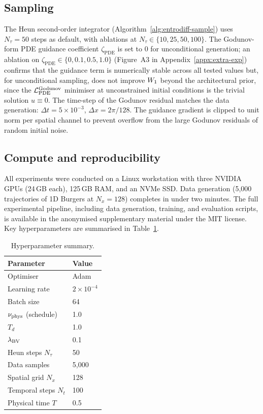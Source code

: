 \subsection{Sampling}
\label{appx:impl:sample}

The Heun second-order integrator (Algorithm~\ref{alg:entrodiff-sample}) uses
$N_{\tau}=50$ steps as default, with ablations at $N_{\tau}\in\{10,25,50,100\}$.
The Godunov-form {PDE} guidance coefficient $\zeta_{\mathrm{PDE}}$ is set to
$0$ for unconditional generation; an ablation on $\zeta_{\mathrm{PDE}}\in\{0,0.1,0.5,1.0\}$
(Figure~A3 in Appendix~\ref{appx:extra-exp}) confirms that the guidance term is numerically
stable across all tested values but, for unconditional sampling, does not
improve $W_{1}$ beyond the architectural prior, since the $\mathcal{L}_{\mathrm{PDE}}^{\mathrm{Godunov}}$
minimiser at unconstrained initial conditions is the trivial solution $u\equiv0$.
The time-step of the Godunov residual matches the data generation:
$\Delta t=5\times10^{-3}$, $\Delta x=2\pi/128$.
The guidance gradient is clipped to unit norm per spatial channel to prevent
overflow from the large Godunov residuals of random initial noise.

\subsection{Compute and reproducibility}
\label{appx:impl:compute}

All experiments were conducted on a Linux workstation with three NVIDIA GPUs
(24\,GB each), 125\,GB RAM, and an NVMe SSD. Data generation (5,000 trajectories
of 1D Burgers at $N_{x}=128$) completes in under two minutes. The full
experimental pipeline, including data generation, training, and evaluation
scripts, is available in the anonymised supplementary material under the
MIT license. Key hyperparameters are summarised in Table~\ref{tab:hyperparams}.

\begin{table}[h]
    \caption{Hyperparameter summary.}
    \label{tab:hyperparams}
    \centering
    \begin{tabular}{ll}
        \toprule
        Parameter & Value \\
        \midrule
        Optimiser & Adam \\
        Learning rate & $2\times10^{-4}$ \\
        Batch size & 64 \\
        $\nu_{\mathrm{phys}}$ (schedule) & 1.0 \\
        $T_{d}$ & 1.0 \\
        $\lambda_{\mathrm{BV}}$ & 0.1 \\
        Heun steps $N_{\tau}$ & 50 \\
        Data samples & 5,000 \\
        Spatial grid $N_{x}$ & 128 \\
        Temporal steps $N_{t}$ & 100 \\
        Physical time $T$ & 0.5 \\
        \bottomrule
    \end{tabular}
\end{table}
